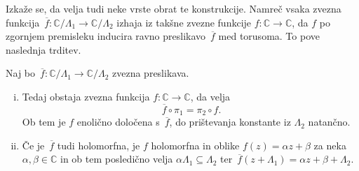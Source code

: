 \documentclass[mat1]{fmfdelo}
\numberwithin{equation}{section}
\newcommand{\C}{\mathbb C}
\newcommand{\inv}{^{-1}}
\newcommand{\torus}{\C/\Lambda}
\newcommand{\olsi}[1]{\,\overline{\!{#1}}} %
\newcommand{\tj}{tj.\ }
\theoremstyle{definition}
\begin{document}




Izkaže se, da velja tudi neke vrste obrat te konstrukcije. Namreč vsaka zvezna funkcija $\olsi{f}: \C/\Lambda_1 \to \C/\Lambda_2$ izhaja iz takšne zvezne funkcije $f:\C \to \C$, da $f$ po zgornjem premisleku inducira ravno preslikavo $\olsi{f}$ med torusoma. To pove naslednja trditev.



\begin{trditev}
    \label{oblika holomorfnih preslikav med torusi}
    Naj bo $\olsi{f} : \C/\Lambda_1 \to \C/\Lambda_2$ zvezna preslikava.
    \begin{enumerate}[(i)]
        \item 
    Tedaj obstaja zvezna funkcija $f: \C \to \C$, da velja 
    \[
        \olsi{f} \circ \pi_1 = \pi_2 \circ f.
    \]
    Ob tem je $f$ enolično določena s $\olsi{f}$, do prištevanja konstante iz $\Lambda_2$ natančno. 
        \item
    Če je $\olsi{f}$ tudi holomorfna, je $f$ holomorfna in oblike $f(z) = \alpha z + \beta$ za neka $\alpha, \beta \in \C$ in ob tem posledično velja $\alpha\Lambda_1 \subseteq \Lambda_2$ ter $\olsi{f}(z + \Lambda_1) = \alpha z + \beta + \Lambda_2$.   
    \end{enumerate}
\end{trditev}
\end{document}
